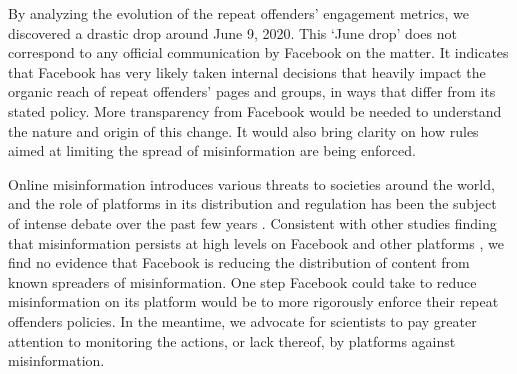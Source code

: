 \documentclass[11pt,a4paper]{article}
\begin{document}
By analyzing the evolution of the repeat offenders’ engagement metrics, we discovered a drastic drop around June 9, 2020. 
This `June drop' does not correspond to any official communication by Facebook on the matter. 
It indicates that Facebook has very likely taken internal decisions that heavily impact the organic reach of repeat offenders' pages and groups, in ways that differ from its stated policy. 
More transparency from Facebook would be needed to understand the nature and origin of this change. 
It would also bring clarity on how rules aimed at limiting the spread of misinformation are being enforced.

Online misinformation introduces various threats to societies around the world, and the role of platforms in its distribution and regulation has been the subject of intense debate over the past few years \citep{rogers2020deplatforming, de2020internet}. 
Consistent with other studies finding that misinformation persists at high levels on Facebook and other platforms \citep{kornbluh2020new, resnick2018iffy}, we find no evidence that Facebook is reducing the distribution of content from known spreaders of misinformation. 
One step Facebook could take to reduce misinformation on its platform would be to more rigorously enforce their repeat offenders policies. 
In the meantime, we advocate for scientists to pay greater attention to monitoring the actions, or lack thereof, by platforms against misinformation. 

 


\end{document}
